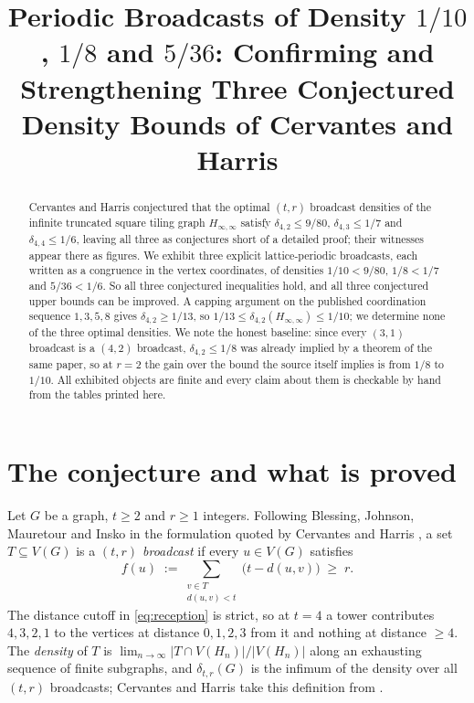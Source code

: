 \documentclass[11pt]{amsart}
\title[Broadcast densities of the truncated square tiling]{Periodic Broadcasts of Density
\texorpdfstring{$1/10$}{1/10}, \texorpdfstring{$1/8$}{1/8} and \texorpdfstring{$5/36$}{5/36}:
Confirming and Strengthening Three Conjectured Density Bounds of Cervantes and Harris}
\date{}
\theoremstyle{definition}
\begin{document}
\begin{abstract}
Cervantes and Harris conjectured that the optimal $(t,r)$ broadcast densities of the infinite
truncated square tiling graph $H_{\infty,\infty}$ satisfy
$\delta_{4,2}\leq 9/80$, $\delta_{4,3}\leq 1/7$ and $\delta_{4,4}\leq 1/6$, leaving all three
as conjectures short of a detailed proof; their witnesses appear there as figures. We exhibit
three explicit lattice-periodic broadcasts, each written as a congruence in the vertex
coordinates, of densities $1/10<9/80$, $1/8<1/7$ and $5/36<1/6$. So all three conjectured
inequalities hold, and all three conjectured upper bounds can be improved. A capping argument on
the published coordination sequence $1,3,5,8$ gives
$\delta_{4,2}\geq 1/13$, so $1/13\leq\delta_{4,2}(H_{\infty,\infty})\leq 1/10$; we determine
none of the three optimal densities. We note the honest baseline: since every $(3,1)$ broadcast
is a $(4,2)$ broadcast, $\delta_{4,2}\leq 1/8$ was already implied by a theorem of the same
paper, so at $r=2$ the gain over the bound the source itself implies is from $1/8$ to $1/10$.
All exhibited objects are finite and every claim about them is checkable by hand from
the tables printed here.
\end{abstract}

\maketitle

\section{The conjecture and what is proved}

Let $G$ be a graph, $t\geq 2$ and $r\geq 1$ integers. Following Blessing, Johnson, Mauretour and
Insko \cite{BJMI} in the formulation quoted by Cervantes and Harris
\cite{CervantesHarris}, a set $T\subseteq V(G)$ is a \emph{$(t,r)$ broadcast} if every
$u\in V(G)$ satisfies
\begin{equation}\label{eq:reception}
  f(u)\;:=\!\!\sum_{\substack{v\in T\\ d(u,v)<t}}\!\!\bigl(t-d(u,v)\bigr)\;\geq\;r .
\end{equation}
The distance cutoff in \eqref{eq:reception} is strict, so at $t=4$ a tower contributes
$4,3,2,1$ to the vertices at distance $0,1,2,3$ from it and nothing at distance $\geq 4$. The
\emph{density} of $T$ is $\lim_{n\to\infty}|T\cap V(H_n)|/|V(H_n)|$ along an exhausting
sequence of finite subgraphs, and $\delta_{t,r}(G)$ is the infimum of the density over all
$(t,r)$ broadcasts; Cervantes and Harris take this definition from \cite{DHR}.
\end{document}
